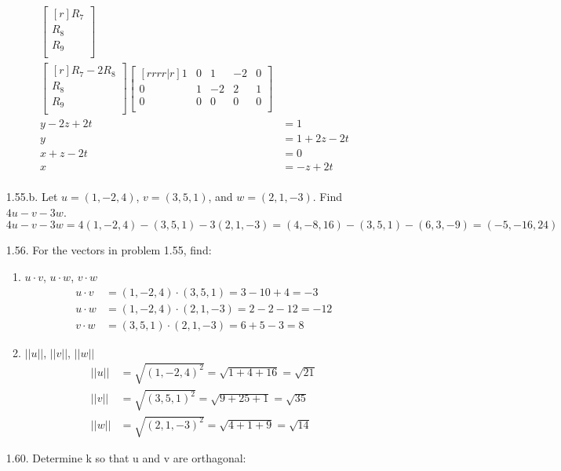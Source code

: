 \documentclass[12pt]{article}
\begin{document}
\begin{enumerate}
\begin{align*}
	\begin{bmatrix}[r]
	R_{7}\\ R_{8}\\ R_{9}\\	
	\end{bmatrix}\\
	\begin{bmatrix}[r]
	R_7 - 2R_8\\
	R_8\\
	R_9\\
	\end{bmatrix}
	\begin{bmatrix}[rrrr|r]
	1 & 0 & 1 & -2 & 0\\
	0 & 1 & -2 & 2 & 1\\
	0 & 0 & 0 & 0 & 0\\
	\end{bmatrix}\\
	y-2z+2t&=1\\
	y&=1+2z-2t\\
	x+z-2t&=0\\
	x&=-z+2t\\
	\end{align*}
\item[1.55.b.] Let $u=(1,-2,4)$, $v=(3,5,1)$, and $w=(2,1,-3)$. Find $4u-v-3w$.
	\[ 4u-v-3w = 4(1,-2,4)-(3,5,1)-3(2,1,-3) = (4,-8,16)-(3,5,1)-(6,3,-9)
		= (-5,-16,24) \]
\item[1.56.] For the vectors in problem 1.55, find:
	\begin{enumerate}
	\item $u \cdot v$, $u \cdot w$, $v \cdot w$
	\begin{align*}
		u \cdot v &= (1,-2,4)\cdot(3,5,1) = 3-10+4 = -3\\
		u \cdot w &= (1,-2,4)\cdot(2,1,-3)= 2-2-12 = -12\\
		v \cdot w &= (3,5,1) \cdot(2,1,-3)= 6+5-3  = 8
	\end{align*}
	\item $||u||$, $||v||$, $||w||$
	\begin{align*}
		||u|| &= \sqrt{(1,-2,4)^2} = \sqrt{1+4+16} = \sqrt{21}\\
		||v|| &= \sqrt{(3,5,1)^2}  = \sqrt{9+25+1} = \sqrt{35}\\
		||w|| &= \sqrt{(2,1,-3)^2} = \sqrt{4+1+9}  = \sqrt{14}
	\end{align*}
	\end{enumerate}
\item[1.60.] Determine k so that u and v are orthagonal:
	\begin{enumerate}

\end{enumerate}
\end{enumerate}
\end{document}
